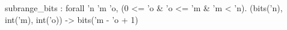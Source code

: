 subrange_bits : forall 'n 'm 'o, (0 <= 'o & 'o <= 'm & 'm < 'n). (bits('n), int('m), int('o)) -> bits('m - 'o + 1)